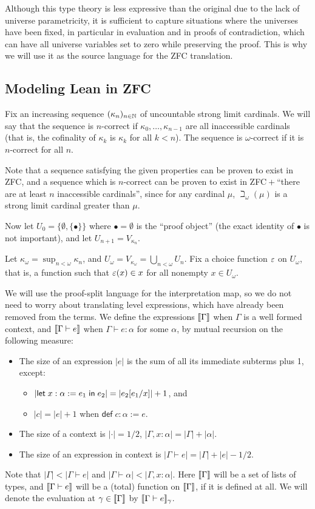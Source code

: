 Although this type theory is less expressive than the original due to the lack of universe parametricity, it is sufficient to capture situations where the universes have been fixed, in particular in evaluation and in proofs of contradiction, which can have all universe variables set to zero while preserving the proof. This is why we will use it as the source language for the ZFC translation.

\subsection{Modeling Lean in ZFC}
Fix an increasing sequence $(\kappa_n)_{n\in\mathbb{N}}$ of uncountable strong limit cardinals. We will say that the sequence is $n$-correct if $\kappa_0,\dots,\kappa_{n-1}$ are all inaccessible cardinals (that is, the cofinality of $\kappa_k$ is $\kappa_k$ for all $k<n$). The sequence is $\omega$-correct if it is $n$-correct for all $n$.

Note that a sequence satisfying the given properties can be proven to exist in ZFC, and a sequence which is $n$-correct can be proven to exist in ZFC${}+{}$``there are at least $n$ inaccessible cardinals'', since for any cardinal $\mu$, $\beth_\omega(\mu)$ is a strong limit cardinal greater than $\mu$.

Now let $U_0=\{\emptyset,\{\bullet\}\}$ where $\bullet=\emptyset$ is the ``proof object'' (the exact identity of $\bullet$ is not important), and let $U_{n+1}=V_{\kappa_n}$.

Let $\kappa_\omega=\operatorname{sup}_{n<\omega}\kappa_n$, and $U_\omega=V_{\kappa_\omega}=\bigcup_{n<\omega} U_n$. Fix a choice function $\varepsilon$ on $U_\omega$, that is, a function such that $\varepsilon(x)\in x$ for all nonempty $x\in U_\omega$.

We will use the proof-split language for the interpretation map, so we do not need to worry about translating level expressions, which have already been removed from the terms. We define the expressions $\scott{\Gamma}$ when $\Gamma$ is a well formed context, and $\scott{\Gamma\vdash e}$ when $\Gamma\vdash e:\alpha$ for some $\alpha$, by mutual recursion on the following measure:
\begin{itemize}
\item The size of an expression $|e|$ is the sum of all its immediate subterms plus 1, except:
\begin{itemize}
\item $|\mathsf{let}\;x:\alpha:=e_1\mathrel{\mathsf{in}}e_2|=|e_2[e_1/x]|+1$, and
\item $|c|=|e|+1$ when $\mathsf{def}\;c:\alpha:=e$.
\end{itemize}
\item The size of a context is $|{\cdot}|=1/2$, $|\Gamma,x:\alpha|=|\Gamma|+|\alpha|$.
\item The size of an expression in context is $|\Gamma\vdash e|=|\Gamma|+|e|-1/2$.
\end{itemize}
Note that $|\Gamma|<|\Gamma\vdash e|$ and $|\Gamma\vdash\alpha|<|\Gamma,x:\alpha|$. Here $\scott{\Gamma}$ will be a set of lists of types, and $\scott{\Gamma\vdash e}$ will be a (total) function on $\scott{\Gamma}$, if it is defined at all. We will denote the evaluation at $\gamma\in\scott{\Gamma}$ by $\scott{\Gamma\vdash e}_\gamma$.

